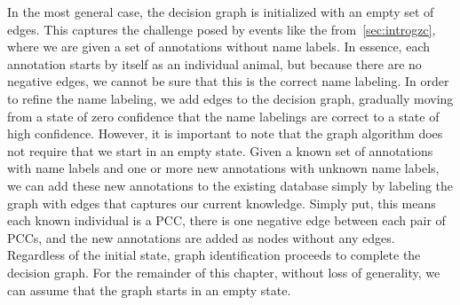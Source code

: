 In the most general case, the decision graph is initialized with an empty set of edges.
This captures the challenge posed by events like the \GZC{} from~\cref{sec:introgzc}, where we are given a set of
  annotations without name labels.
In essence, each annotation starts by itself as an individual animal, but because there are no negative edges, we
  cannot be sure that this is the correct name labeling.
In order to refine the name labeling, we add edges to the decision graph, gradually moving from a state of zero
  confidence that the name labelings are correct to a state of high confidence.
However, it is important to note that the graph algorithm does not require that we start in an empty state.
Given a known set of annotations with name labels and one or more new annotations with unknown name labels, we
  can add these new annotations to the existing database simply by labeling the graph with edges that captures our
  current knowledge.
Simply put, this means each known individual is a PCC, there is one negative edge between each pair of PCCs, and
  the new annotations are added as nodes without any edges.
Regardless of the initial state, graph identification proceeds to complete the decision graph.
For the remainder of this chapter, without loss of generality, we can assume that the graph starts in an empty
  state.



